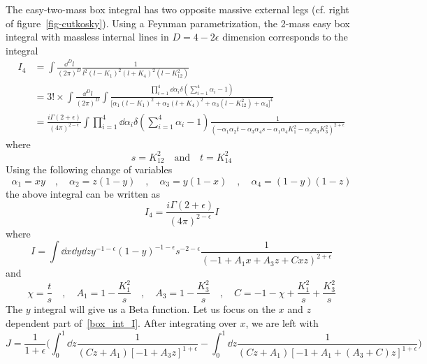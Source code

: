 The easy-two-mass box integral has two opposite massive external legs (cf. right of figure~\ref{fig-cutkosky}).
Using a Feynman parametrization, the 2-mass easy box integral with massless internal lines in $D=4-2\epsilon$ dimension corresponds to the integral \begin{equation}
\begin{split}
I_4 & = \int\frac{\dd^D l }{(2\pi)^D}\frac{1}{ l^2(l-K_1)^2(l+K_4)^2 (l-K_{12}^2)}
\\
&=
3!\times\int\frac{\dd^D l }{(2\pi)^D}
\int
\frac{\prod_{i=1}^4\dd\alpha_i \delta(\sum_{i=1}^4\alpha_i -1)}{\big[\alpha_1(l-K_1)^2 + \alpha_2(l+K_4)^2 + \alpha_3 (l-K_{12}^2) + \alpha_4\big]^4}
\\
&= \frac{i\Gamma(2+\epsilon)}{(4\pi)^{2-\epsilon}}\int\prod_{i=1}^4\dd\alpha_i \delta(\sum_{i=1}^4\alpha_i -1)\frac{1}{(-\alpha_1\alpha_2 t - \alpha_3\alpha_4 s 
-\alpha_1\alpha_4 K_1^2 - \alpha_2\alpha_3 K_{3}^2)^{2+\epsilon}}
\end{split}
\end{equation}
where
\begin{equation}
s=K_{12}^2 \quad\mathrm{and}\quad t=K_{14}^2
\end{equation}
Using the following change of variables
\begin{equation}
\alpha_1 = xy \quad,\quad
\alpha_2 = z(1-y)\quad,\quad
\alpha_3 = y(1-x)\quad,\quad
\alpha_4 = (1-y)(1-z)
\end{equation}
the above integral can be written as
\begin{equation}
I_4 = \frac{i\Gamma(2+\epsilon)}{(4\pi)^{2-\epsilon}} I
\end{equation}
where
\begin{equation}\label{box_int_I}
I = \int\dd x\dd y \dd z y^{-1-\epsilon}(1-y)^{-1-\epsilon}s^{-2-\epsilon}
\frac{1}{(-1 + A_1 x + A_3 z + C xz)^{2+\epsilon}}
\end{equation}
and
\begin{equation}
\chi = \frac{t}{s}\quad, \quad
A_1 = 1 - \frac{K_1^2}{s}\quad, \quad
A_3 = 1 - \frac{K_3^2}{s} \quad,\quad
C = -1 - \chi  + \frac{K_1^2}{s} + \frac{K_3^2}{s}
\end{equation}
The $y$ integral will give us a Beta function.
Let us focus on the $x$ and $z$ dependent part of~\cref{box_int_I}.
After integrating over $x$, we are left with 
\begin{equation}
J = \frac{1}{1+\epsilon}\Big(\int^1_0\dd z\frac{1}{(Cz + A_1)[-1 + A_3z]^{1+\epsilon}} - 
\int^1_0\dd z\frac{1}{(Cz + A_1)[-1 + A_1  + (A_3 + C)z]^{1+\epsilon} }\Big)
\end{equation}
